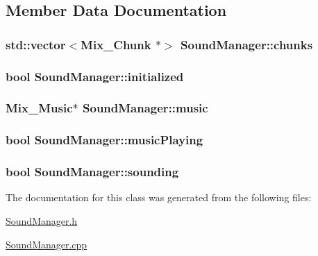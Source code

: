 \subsection{Member Data Documentation}
\hypertarget{classSoundManager_a591ec09cf6486bc6ff62c458b1718630}{
\subsubsection[{chunks}]{\setlength{\rightskip}{0pt plus 5cm}std\-::vector$<$Mix\-\_\-\-Chunk $\ast$$>$ Sound\-Manager\-::chunks\hspace{0.3cm}{\ttfamily [private]}}}\label{classSoundManager_a591ec09cf6486bc6ff62c458b1718630}
\hypertarget{classSoundManager_a4d95e056b1fe09c91fc601e8062b9b9b}{
\subsubsection[{initialized}]{\setlength{\rightskip}{0pt plus 5cm}bool Sound\-Manager\-::initialized\hspace{0.3cm}{\ttfamily [private]}}}\label{classSoundManager_a4d95e056b1fe09c91fc601e8062b9b9b}
\hypertarget{classSoundManager_add68d7295ec04f3d1fb351199ef943a3}{
\subsubsection[{music}]{\setlength{\rightskip}{0pt plus 5cm}Mix\-\_\-\-Music$\ast$ Sound\-Manager\-::music\hspace{0.3cm}{\ttfamily [private]}}}\label{classSoundManager_add68d7295ec04f3d1fb351199ef943a3}
\hypertarget{classSoundManager_a448beccb044e3cbdbe72262f73bd464c}{
\subsubsection[{music\-Playing}]{\setlength{\rightskip}{0pt plus 5cm}bool Sound\-Manager\-::music\-Playing\hspace{0.3cm}{\ttfamily [private]}}}\label{classSoundManager_a448beccb044e3cbdbe72262f73bd464c}
\hypertarget{classSoundManager_a099128ef18dacf43acd4942aedf712a2}{
\subsubsection[{sounding}]{\setlength{\rightskip}{0pt plus 5cm}bool Sound\-Manager\-::sounding\hspace{0.3cm}{\ttfamily [private]}}}\label{classSoundManager_a099128ef18dacf43acd4942aedf712a2}


The documentation for this class was generated from the following files\-:\begin{DoxyCompactItemize}
\item 
\hyperlink{SoundManager_8h}{Sound\-Manager.\-h}\item 
\hyperlink{SoundManager_8cpp}{Sound\-Manager.\-cpp}\end{DoxyCompactItemize}
